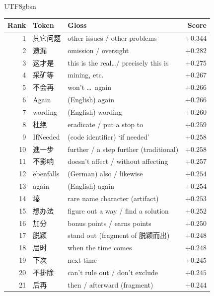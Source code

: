 \documentclass{article}
\begin{document}
\begin{table}[h]
\centering
\small
\begin{CJK}{UTF8}{gbsn}
\begin{tabular}{rllr}
\toprule
Rank & Token & Gloss & Score \\
\midrule
1  & 其它问题   & other issues / other problems            & $+0.344$ \\
2  & 遗漏       & omission / oversight                      & $+0.282$ \\
3  & 这才是     & this is the real\dots / precisely this is & $+0.275$ \\
4  & 采矿等     & mining, etc.                              & $+0.267$ \\
5  & 不会再     & won't \dots\ again                        & $+0.266$ \\
6  & Again      & (English) again                           & $+0.266$ \\
7  & wording    & (English) wording                         & $+0.260$ \\
8  & 杜绝       & eradicate / put a stop to                 & $+0.259$ \\
9  & IfNeeded   & (code identifier) `if needed'             & $+0.258$ \\
10 & 進一步     & further / a step further (traditional)    & $+0.258$ \\
11 & 不影响     & doesn't affect / without affecting        & $+0.257$ \\
12 & ebenfalls  & (German) also / likewise                  & $+0.254$ \\
13 & again      & (English) again                           & $+0.254$ \\
14 & 瑧         & rare name character (artifact)          & $+0.253$ \\
15 & 想办法     & figure out a way / find a solution        & $+0.252$ \\
16 & 加分       & bonus points / earns points               & $+0.250$ \\
17 & 脱颖       & stand out (fragment of 脱颖而出)          & $+0.248$ \\
18 & 届时       & when the time comes                       & $+0.248$ \\
19 & 下次       & next time                                 & $+0.245$ \\
20 & 不排除     & can't rule out / don't exclude            & $+0.245$ \\
21 & 后再       & then / afterward (fragment)               & $+0.244$ \\

\end{tabular}
\end{CJK}
\end{table}
\end{document}
